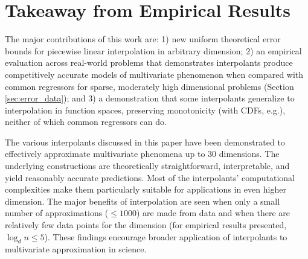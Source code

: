 \section{Takeaway from Empirical Results}
\label{sec:error_conclusion}

The major contributions of this work are: 1) new uniform theoretical
error bounds for piecewise linear interpolation in arbitrary dimension;
2) an empirical evaluation across
real-world problems that demonstrates interpolants produce
competitively accurate models of multivariate phenomenon when compared
with common regressors for sparse, moderately high dimensional
problems (Section \ref{sec:error_data}); and 3) a demonstration that some
interpolants generalize to interpolation in function spaces, 
preserving monotonicity (with CDFs, e.g.), neither
of which common regressors can do.

The various interpolants discussed in this paper have been
demonstrated to effectively approximate multivariate phenomena up to
$30$ dimensions. The underlying constructions are theoretically
straightforward, interpretable, and yield reasonably accurate
predictions. Most of the interpolants' computational complexities make
them particularly suitable for applications in even higher
dimension. The major benefits of interpolation are seen when only a
small number of approximations ($\leq 1000$) are made from data and
when there are relatively few data points for the dimension (for
empirical results presented, $\log_d n \leq 5$). These findings
encourage broader application of interpolants to multivariate
approximation in science.



